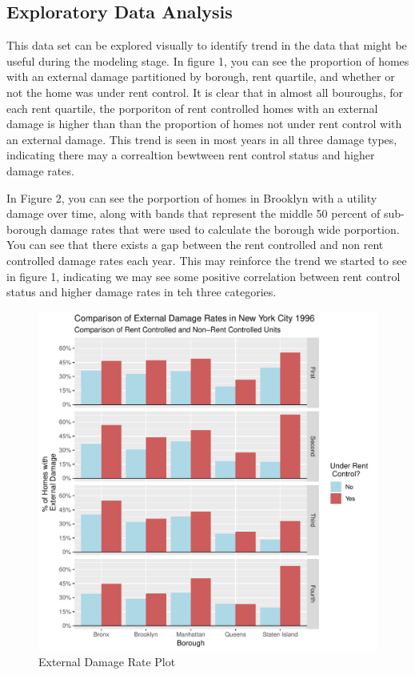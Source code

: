 \documentclass[11pt]{asaproc}\usepackage[]{graphicx}\usepackage[]{color}
\makeatletter
\def\maxwidth{ %
  \ifdim\Gin@nat@width>\linewidth
    \linewidth
  \else
    \Gin@nat@width
  \fi
}
\newenvironment{knitrout}{}{} %
\makeatother
\begin{document}
\subsection{Exploratory Data Analysis}
This data set can be explored visually to identify trend in the data that might be useful during the modeling stage. In figure 1, you can see the proportion of homes with an external damage partitioned by borough, rent quartile, and whether or not the home was under rent control. It is clear that in almost all bouroughs, for each rent quartile, the porporiton of rent controlled homes with an external damage is higher than than the proportion of homes not under rent control with an external damage. This trend is seen in most years in all three damage types, indicating there may a correaltion bewtween rent control status and higher damage rates.

In Figure 2, you can see the porportion of homes in Brooklyn with a utility damage over time, along with bands that represent the middle 50 percent of sub-borough damage rates that were used to calculate the borough wide porportion. You can see that there exists a gap between the rent controlled and non rent controlled damage rates each year. This may reinforce the trend we started to see in figure 1, indicating we may see some positive correlation between rent control status and higher damage rates in teh three categories.
 


\begin{figure}
\begin{center}
\begin{knitrout}
\color{fgcolor}
\includegraphics[width=\maxwidth]{figure/fig1-1} 

\end{knitrout}
\end{center}
\caption{External Damage Rate Plot}
\label{fig:one}
\end{figure}
\end{document}
